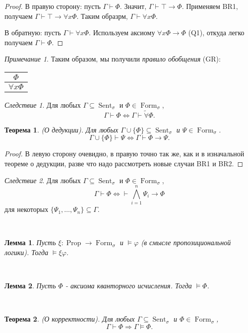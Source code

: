 \documentclass[a4paper,100pt]{article}
\theoremstyle{indented}
\newtheorem{theorem}{Теорема}
\newtheorem{lemma}{Лемма}
\theoremstyle{definition}
\theoremstyle{remark}
\newtheorem{remark}{Примечание}
\newtheorem{cons}{Следствие}
\DeclareMathOperator{\ra}{\rightarrow}
\DeclareMathOperator{\Llra}{\Longleftrightarrow}
\DeclareMathOperator{\Prop}{Prop}
\DeclareMathOperator{\form}{Form}
\DeclareMathOperator{\Sent}{Sent}
\begin{document}
\begin{proof}
  В правую сторону: пусть $\Gamma \vdash \Phi$. Значит, $\Gamma \vdash \top \ra \Phi$. Применяем BR1, получаем $\Gamma \vdash \top \ra \forall x \Phi$. Таким образрм, $\Gamma \vdash \forall x \Phi$. \ 

  В обратную: пусть $\Gamma \vdash \forall x \Phi$. Используем аксиому $\forall x \Phi \ra \Phi$ (Q1), откуда легко получаем $\Gamma \vdash \Phi$. 
\end{proof}

\begin{remark}
  Таким образом, мы получили \textit{правило обобщения} (GR):

  \begin{center}
    \begin{tabular}{c}
      $\Phi$ \\ 
      \hline
      $\forall x \Phi$ 
    \end{tabular}
  \end{center}
\end{remark}

\begin{cons}
  Для любых $\Gamma \subseteq \Sent_\sigma$ и $\Phi \in \form_\sigma$, 
  \[
    \Gamma \vdash \Phi \Llra \Gamma \vdash \tilde{\forall} \Phi.
  \]
\end{cons}

\begin{theorem}
  (О дедукции). Для любых $\Gamma \cup \{\Phi\}\subseteq \Sent_\sigma$ и $\Psi \in \form_\sigma$. 
  \[
    \Gamma \cup \{ \Phi \} \vdash \Psi \Llra \Gamma \vdash \Phi \ra \Psi. 
  \]
\end{theorem}

\begin{proof}
  В левую сторону очевидно, в правую точно так же, как и в изначальной теореме о дедукции, разве что надо рассмотреть новые случаи BR1 и BR2. 
\end{proof}

\begin{cons}
  Для любых $\Gamma \subseteq \Sent_\sigma$ и $\Phi \in \form_\sigma$,  
  \[
    \Gamma \vdash \Phi \Longleftrightarrow \vdash \bigwedge_{i=1}^n \Psi_i\rightarrow \Phi
  \]
  для некоторых $\{\Psi_1, \ldots, \Psi_n\}\subseteq \Gamma$.
\end{cons} \

\begin{lemma}
  Пусть $\xi: \Prop \ra \form_\sigma$ и $\vDash \varphi$ (в смысле пропозициональной логики). Тогда $\vDash \xi \varphi$. 
\end{lemma} \

\begin{lemma}
  Пусть $\Phi$ - аксиома кванторного исчисления. Тогда $\vDash \Phi$. 
\end{lemma} \

\begin{theorem}
  (О корректности). Для любых $\Gamma \subseteq \Sent_\sigma$ и $\Phi \in \form_\sigma$, 
  \[
    \Gamma \vdash \Phi \Longrightarrow \Gamma \vDash \Phi. 
  \]
\end{theorem}
\end{document}
